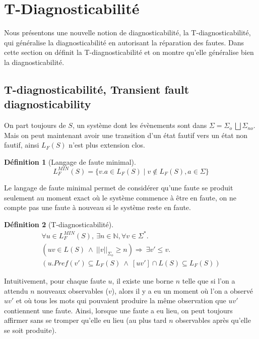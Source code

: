 \documentclass[conference]{IEEEtran}
\newtheorem{mydef}{D\'efinition}
\begin{document}

\section{T-Diagnosticabilité}

Nous présentons une nouvelle notion de diagnosticabilité, la T-diagnosticabilité,  qui généralise la diagnosticabilité en autorisant la réparation des fautes. Dans cette section on définit la T-diagnosticabilité et on montre qu'elle généralise bien la diagnosticabilité.

\subsection{T-diagnosticabilité, Transient fault diagnosticability}
On part toujours de $S$, un système dont les évènements sont dans $\Sigma = \Sigma_o \ \bigsqcup \Sigma_{no}$. Mais on peut maintenant avoir une transition d'un état fautif vers un état non fautif, ainsi $L_F(S)$ n'est plus extension clos.

\begin{mydef}[Langage de faute minimal]

$$L_{F}^{MIN}(S) =  \{v.a \in L_F(S) \mid v\not \in L_F(S), a\in \Sigma \} $$
\end{mydef}

Le langage de faute minimal permet de considérer qu'une faute se produit seulement au moment exact où le système commence à être en faute, on ne compte pas une faute à nouveau si le système reste en faute.

\begin{mydef}[T-diagnosticabilité]

$$\begin{array}{l}
\forall u \in L^{MIN}_F(S),\ \exists n \in \mathbb{N}, \forall v \in \Sigma^*.\\
(uv \in L(S) \ \wedge \  ||v||_{\Sigma_o}\geq n) \Rightarrow \ \exists v' \leq v. \\
(u.Pref(v') \subseteq L_F(S) \ \wedge \  [uv'] \cap L(S) \subseteq L_F(S))
\end{array}$$
\end{mydef}

Intuitivement, pour chaque faute $u$, il existe une borne $n$ telle que si l'on a attendu $n$ nouveaux observables ($v$), alors il y a eu un moment où l'on a observé $uv'$ et où tous les mots qui pouvaient produire la m\^eme observation que $uv'$ contiennent une faute. Ainsi, lorsque une faute a eu lieu, on peut toujours affirmer sans se tromper qu'elle eu lieu (au plus tard $n$ observables après qu'elle se soit produite).
\end{document}
